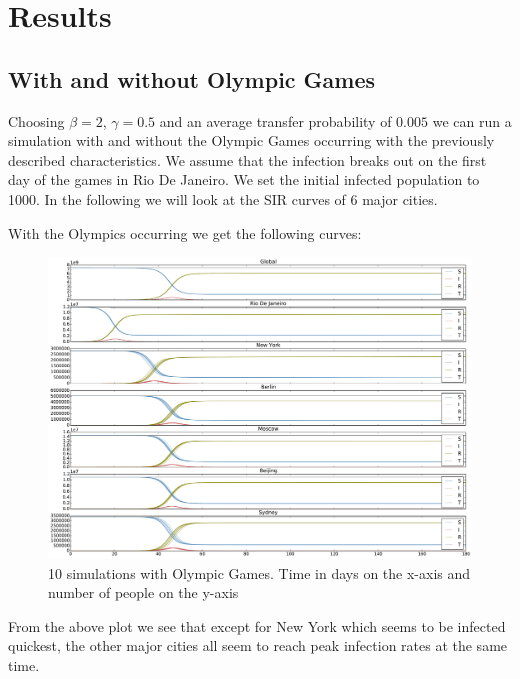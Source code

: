 \section{Results}
\subsection{With and without Olympic Games}
Choosing $\beta=2$, $\gamma=0.5$ and an average transfer probability of $0.005$ we can run a simulation with and without the Olympic Games occurring with the previously described characteristics. We assume that the infection breaks out on the first day of the games in Rio De Janeiro. We set the initial infected population to 1000. In the following we will look at the SIR curves of 6 major cities.

With the Olympics occurring we get the following curves:
\begin{figure}[H]
	\centering
	\includegraphics[width=1.0 \linewidth]{plots/rio-0-18-380000.pdf}
	\caption{10 simulations with Olympic Games. Time in days on the x-axis and number of people on the y-axis}
\end{figure}

From the above plot we see that except for New York which seems to be infected quickest, the other major cities all seem to reach peak infection rates at the same time. 

